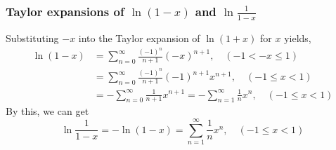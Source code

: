 \documentclass{article}
\theoremstyle{remark}
\begin{document}
\subsubsection{Taylor expansions of $\ln(1-x)$ and $\ln\frac{1}{1-x}$}
Substituting $-x$ into the Taylor expansion of $\ln(1+x)$ for $x$ yields,
\begin{align*}
  \ln(1-x) &=\sum_{n=0}^{\infty}\frac{(-1)^{n}}{n+1}(-x)^{n+1},\quad (-1< -x\le 1) \\
  &=\sum_{n=0}^{\infty}\frac{(-1)^{n}}{n+1}(-1)^{n+1}x^{n+1},\quad (-1\le x< 1)  \\
  &=-\sum_{n=0}^{\infty}\frac{1}{n+1}x^{n+1}
  =-\sum_{n=1}^{\infty}\frac{1}{n}x^{n},\quad (-1\le x< 1)
\end{align*}
By this, we can get
\[
\ln\frac{1}{1-x}=-\ln(1-x)=\sum_{n=1}^{\infty}\frac{1}{n}x^{n},\quad (-1\le x< 1)
\]


\end{document}

